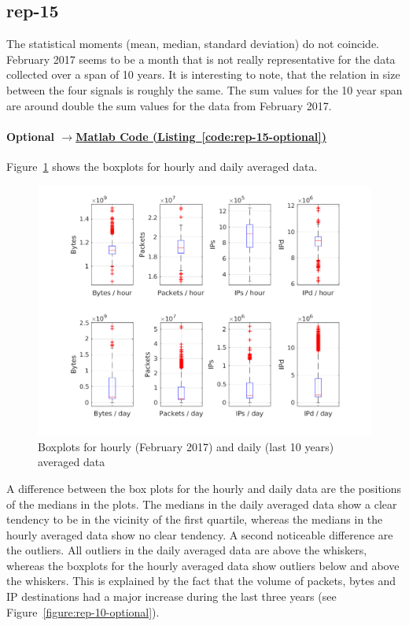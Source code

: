 \documentclass{article}
\newcommand{\codelink}[1]{%
    \hyperref[#1]{\quad$\rightarrow$\enskip Matlab Code (Listing~\ref{#1})}%
}
\begin{document}
\subsection{rep-15}

The statistical moments (mean, median, standard deviation) do not coincide. February 2017 seems to be a month
that is not really representative for the
data collected over a span of 10 years. It is interesting to note, that the relation in size between the
four signals is roughly the same. The sum values for the 10 year span are around double the sum values for
the data from February 2017.

\paragraph{Optional \codelink{code:rep-15-optional}}
Figure~\ref{figure:rep-15-optional} shows the boxplots for hourly and daily averaged data.

\begin{figure}[h]
    \centering
    \includegraphics[width=\textwidth]{../exercise-3/plots/rep_15_optional}
    \caption{\label{figure:rep-15-optional} Boxplots for hourly (February 2017) and daily (last 10 years) averaged data}
\end{figure}

A difference between the box plots for the hourly and daily data are the positions of
the medians in the plots. The medians in the daily averaged data show a clear tendency to
be in the vicinity of the first quartile, whereas the medians in the hourly averaged data
show no clear tendency.
A second noticeable difference are the outliers. All outliers in the daily averaged data are
above the whiskers, whereas the boxplots for the hourly averaged data show outliers below and
above the whiskers. This is explained by the fact that the volume of packets, bytes and IP destinations
had a major increase during the last three years (see Figure~\ref{figure:rep-10-optional}).
\end{document}
